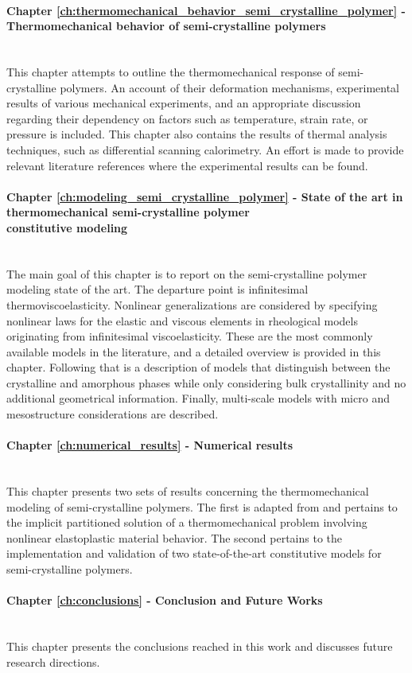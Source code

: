 \paragraph{Chapter \ref{ch:thermomechanical_behavior_semi_crystalline_polymer} - Thermomechanical behavior of semi-crystalline polymers}\mbox{}\\
This chapter attempts to outline the thermomechanical response of semi-crystalline polymers.
An account of their deformation mechanisms, experimental results of various mechanical experiments, and an appropriate discussion regarding their dependency on factors such as temperature, strain rate, or pressure is included.
This chapter also contains the results of thermal analysis techniques, such as differential scanning calorimetry.
An effort is made to provide relevant literature references where the experimental results can be found.

\paragraph{Chapter \ref{ch:modeling_semi_crystalline_polymer} - State of the art in thermomechanical semi-crystalline polymer\\ constitutive modeling}\mbox{}\\
The main goal of this chapter is to report on the semi-crystalline polymer modeling state of the art.
The departure point is infinitesimal thermoviscoelasticity.
Nonlinear generalizations are considered by specifying nonlinear laws for the elastic and viscous elements in rheological models originating from infinitesimal viscoelasticity.
These are the most commonly available models in the literature, and a detailed overview is provided in this chapter.
Following that is a description of models that distinguish between the crystalline and amorphous phases while only considering bulk crystallinity and no additional geometrical information.
Finally, multi-scale models with micro and mesostructure considerations are described.

\paragraph{Chapter \ref{ch:numerical_results} - Numerical results}\mbox{}\\
This chapter presents two sets of results concerning the thermomechanical modeling of semi-crystalline polymers.
The first is adapted from \cite{vila-chaNumericalAssessmentPartitioned2023a} and pertains to the implicit partitioned solution of a thermomechanical problem involving nonlinear elastoplastic material behavior.
The second pertains to the implementation and validation of two state-of-the-art constitutive models for semi-crystalline polymers.

\paragraph{Chapter \ref{ch:conclusions} - Conclusion and Future Works}\mbox{} \\
This chapter presents the conclusions reached in this work and discusses future research directions.
